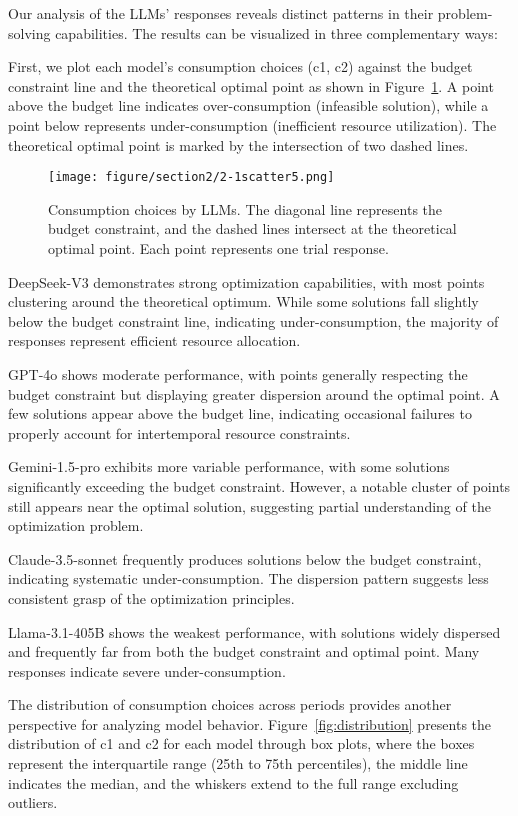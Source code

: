 \documentclass[12pt]{article}
\begin{document}
\begin{CJK*}{UTF8}{gbsn}
Our analysis of the LLMs' responses reveals distinct patterns in their problem-solving capabilities. The results can be visualized in three complementary ways:


First, we plot each model's consumption choices (c1, c2) against the budget constraint line and the theoretical optimal point as shown in Figure~\ref{fig:scatter}. A point above the budget line indicates over-consumption (infeasible solution), while a point below represents under-consumption (inefficient resource utilization). The theoretical optimal point is marked by the intersection of two dashed lines.
\begin{figure}[htbp]
    \centering
    \texttt{[image: figure/section2/2-1scatter5.png]}
    \caption{Consumption choices by LLMs. The diagonal line represents the budget constraint, and the dashed lines intersect at the theoretical optimal point. Each point represents one trial response.}
    \label{fig:scatter}
\end{figure}

DeepSeek-V3 demonstrates strong optimization capabilities, with most points clustering around the theoretical optimum. While some solutions fall slightly below the budget constraint line, indicating under-consumption, the majority of responses represent efficient resource allocation.

GPT-4o shows moderate performance, with points generally respecting the budget constraint but displaying greater dispersion around the optimal point. A few solutions appear above the budget line, indicating occasional failures to properly account for intertemporal resource constraints.

Gemini-1.5-pro exhibits more variable performance, with some solutions significantly exceeding the budget constraint. However, a notable cluster of points still appears near the optimal solution, suggesting partial understanding of the optimization problem.

Claude-3.5-sonnet frequently produces solutions below the budget constraint, indicating systematic under-consumption. The dispersion pattern suggests less consistent grasp of the optimization principles.

Llama-3.1-405B shows the weakest performance, with solutions widely dispersed and frequently far from both the budget constraint and optimal point. Many responses indicate severe under-consumption.


The distribution of consumption choices across periods provides another perspective for analyzing model behavior. Figure~\ref{fig:distribution} presents the distribution of c1 and c2 for each model through box plots, where the boxes represent the interquartile range (25th to 75th percentiles), the middle line indicates the median, and the whiskers extend to the full range excluding outliers.


\end{CJK*}
\end{document}
